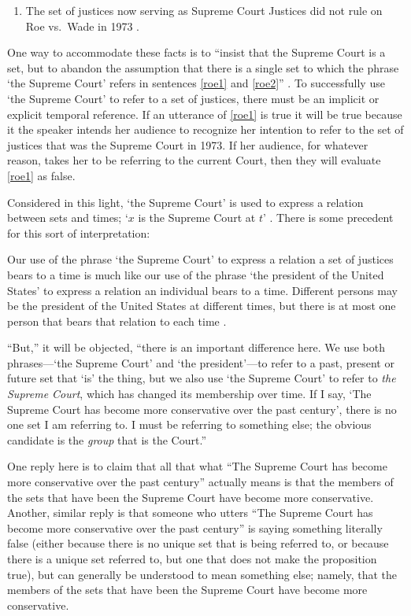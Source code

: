 \documentclass[11pt]{article}
\newenvironment{squote}{%
\begin{spacing}{1}
\begin{list}{}{%
\setlength{\labelwidth}{0pt}%
\rightmargin\leftmargin%
}
\item\relax
}{%
\end{list}%
\end{spacing}
}
\begin{document}
\begin{spacing}{1.5}
\begin{enumerate}[ref=(\arabic*)]
  \item The set of justices now serving as Supreme Court Justices did
    not rule on Roe vs.\ Wade in 1973
    \citep[135]{uzquiano2004a}. \label{roe2}
\end{enumerate}

One way to accommodate these facts is to ``insist that the Supreme
Court is a set, but to abandon the assumption that there is a single
set to which the phrase `the Supreme Court' refers in sentences
\ref{roe1} and \ref{roe2}'' \citep[138]{uzquiano2004a}.  To
successfully use `the Supreme Court' to refer to a set of justices,
there must be an implicit or explicit temporal reference.  If an
utterance of \ref{roe1} is true it will be true because it the speaker
intends her audience to recognize her intention to refer to the set of
justices that was the Supreme Court in 1973.  If her audience, for
whatever reason, takes her to be referring to the current Court, then
they will evaluate \ref{roe1} as false.

Considered in this light, `the Supreme Court' is used to express a
relation between sets and times; `$x$ is the Supreme Court at $t$'
\citep[140]{uzquiano2004a}.  There is some precedent for this sort of
interpretation:

\begin{squote}
Our use of the phrase `the Supreme Court' to express a relation a set
of justices bears to a time is much like our use of the phrase `the
president of the United States' to express a relation an individual
bears to a time.  Different persons may be the president of the United
States at different times, but there is at most one person that bears
that relation to each time \citep[138]{uzquiano2004a}.
\end{squote}

``But,'' it will be objected, ``there is an important difference here.
We use both phrases---`the Supreme Court' and `the president'---to
refer to a past, present or future set that `is' the thing, but we
also use `the Supreme Court' to refer to {\em the Supreme Court},
which has changed its membership over time.  If I say, `The Supreme
Court has become more conservative over the past century', there is no
one set I am referring to.  I must be referring to something else; the
obvious candidate is the {\em group} that is the Court.''

One reply here is to claim that all that what ``The Supreme Court has
become more conservative over the past century'' actually means is
that the members of the sets that have been the Supreme Court have
become more conservative.  Another, similar reply is that someone who
utters ``The Supreme Court has become more conservative over the past
century'' is saying something literally false (either because there is
no unique set that is being referred to, or because there is a unique
set referred to, but one that does not make the proposition true), but
can generally be understood to mean something else; namely, that the
members of the sets that have been the Supreme Court have become more
conservative.


\end{spacing}
\end{document}

